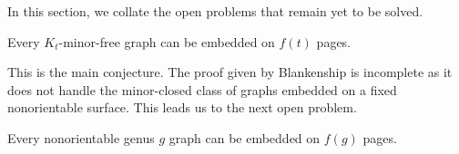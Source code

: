 In this section, we collate the open problems that remain yet to be solved.

\begin{conjecture}
    Every $K_t$-minor-free graph can be embedded on $f(t)$ pages.
\end{conjecture}

This is the main conjecture. The proof given by Blankenship is incomplete as it does not handle the minor-closed class of graphs embedded on a fixed nonorientable surface. This leads us to the next open problem.

\begin{conjecture}
    Every nonorientable genus $g$ graph can be embedded on $f(g)$ pages.
\end{conjecture}

